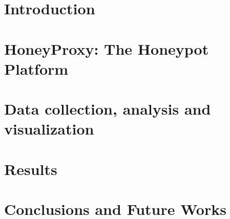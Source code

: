 \documentclass[pdfa%
,cucitura%
]{toptesi}
\begin{document}
\indici

\mainmatter

\chapter{Introduction}



\chapter{HoneyProxy: The Honeypot Platform}



\chapter{Data collection, analysis and visualization}



\chapter{Results}



\chapter{Conclusions and Future Works}




\end{document}
